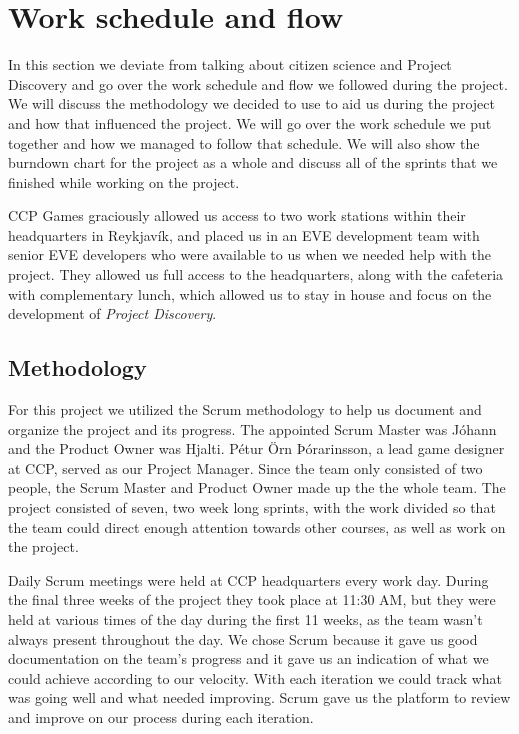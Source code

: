 \section{Work schedule and flow}\label{sec:workscheduleandflow}

In this section we deviate from talking about citizen science and Project Discovery and go over the work schedule and flow we followed during the project. We will discuss the methodology we decided to use to aid us during the project and how that influenced the project. We will go over the work schedule we put together and how we managed to follow that schedule. We will also show the burndown chart for the project as a whole and discuss all of the sprints that we finished while working on the project.

CCP Games graciously allowed us access to two work stations within their headquarters in Reykjavík, and placed us in an EVE development team with senior EVE developers who were available to us when we needed help with the project. They allowed us full access to the headquarters, along with the cafeteria with complementary lunch, which allowed us to stay in house and focus on the development of \emph{Project Discovery}.

\subsection{Methodology}
	For this project we utilized the Scrum methodology to help us document and organize the project and its progress. The appointed Scrum Master was Jóhann and the Product Owner was Hjalti. Pétur Örn Þórarinsson, a lead game designer at CCP, served as our Project Manager. Since the team only consisted of two people, the Scrum Master and Product Owner made up the the whole team. The project consisted of seven, two week long sprints, with the work divided so that the team could direct enough attention towards other courses, as well as work on the project.

	Daily Scrum meetings were held at CCP headquarters every work day. During the final three weeks of the project they took place at 11:30 AM, but they were held at various times of the day during the first 11 weeks, as the team wasn't always present throughout the day. We chose Scrum because it gave us good documentation on the team's progress and it gave us an indication of what we could achieve according to our velocity. With each iteration we could track what was going well and what needed improving. Scrum gave us the platform to review and improve on our process during each iteration.


